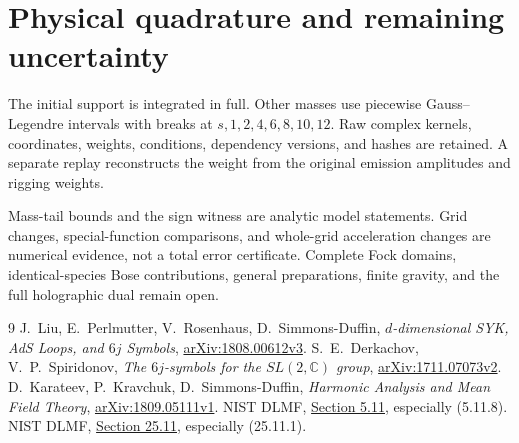\documentclass[11pt,a4paper]{article}
\begin{document}
\section{Physical quadrature and remaining uncertainty}

The initial support is integrated in full. Other masses use piecewise
Gauss--Legendre intervals with breaks at $s,1,2,4,6,8,10,12$.
Raw complex kernels, coordinates, weights, conditions, dependency
versions, and hashes are retained. A separate replay reconstructs
the weight from the original emission amplitudes and rigging weights.

Mass-tail bounds and the sign witness are analytic model statements.
Grid changes, special-function comparisons, and whole-grid
acceleration changes are numerical evidence, not a total error certificate.
Complete Fock domains, identical-species Bose contributions,
general preparations, finite gravity, and the full holographic dual
remain open.

\begin{thebibliography}{9}
 J.~Liu, E.~Perlmutter, V.~Rosenhaus, D.~Simmons-Duffin,
\emph{$d$-dimensional SYK, AdS Loops, and $6j$ Symbols},
\href{https://arxiv.org/abs/1808.00612v3}{arXiv:1808.00612v3}.
 S.~E.~Derkachov, V.~P.~Spiridonov,
\emph{The $6j$-symbols for the $SL(2,\mathbb C)$ group},
\href{https://arxiv.org/abs/1711.07073v2}{arXiv:1711.07073v2}.
 D.~Karateev, P.~Kravchuk, D.~Simmons-Duffin,
\emph{Harmonic Analysis and Mean Field Theory},
\href{https://arxiv.org/abs/1809.05111v1}{arXiv:1809.05111v1}.
 NIST DLMF,
\href{https://dlmf.nist.gov/5.11}{Section 5.11}, especially (5.11.8).
 NIST DLMF,
\href{https://dlmf.nist.gov/25.11}{Section 25.11}, especially (25.11.1).
\end{thebibliography}
\end{document}
